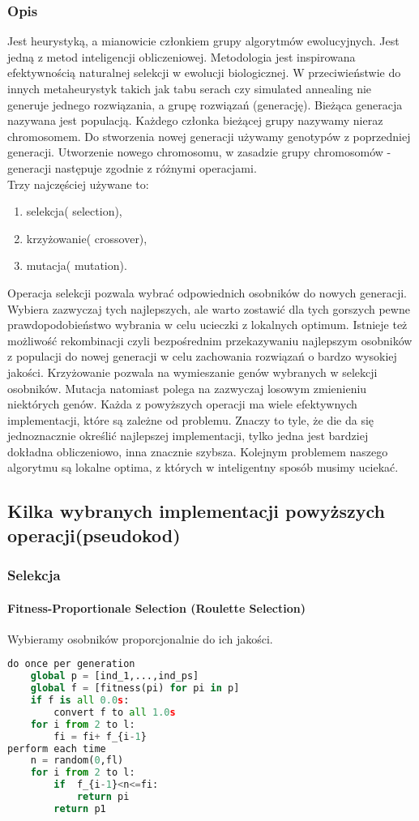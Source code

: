 \documentclass[11pt]{article}
\begin{document}
\subsubsection{Opis}
Jest heurystyką, a mianowicie członkiem grupy algorytmów ewolucyjnych. Jest jedną z metod inteligencji obliczeniowej. Metodologia jest inspirowana efektywnością naturalnej selekcji w ewolucji biologicznej. W przeciwieństwie do innych metaheurystyk takich jak tabu serach czy simulated annealing nie generuje jednego rozwiązania, a grupę rozwiązań (generację). Bieżąca generacja nazywana jest populacją. Każdego członka bieżącej grupy nazywamy nieraz chromosomem. Do stworzenia nowej generacji używamy genotypów z poprzedniej generacji. Utworzenie nowego chromosomu, w zasadzie grupy chromosomów - generacji następuje zgodnie z różnymi operacjami.\\ Trzy najczęściej używane to: \begin{enumerate}
\item selekcja( selection),
\item krzyżowanie( crossover),
\item mutacja( mutation). 
\end{enumerate} 
Operacja selekcji pozwala wybrać odpowiednich osobników do nowych generacji. Wybiera zazwyczaj tych najlepszych, ale warto zostawić dla tych gorszych pewne prawdopodobieństwo wybrania w celu ucieczki z lokalnych optimum. Istnieje też możliwość rekombinacji czyli bezpośrednim przekazywaniu najlepszym osobników z populacji do nowej generacji w celu zachowania rozwiązań o bardzo wysokiej jakości. Krzyżowanie pozwala na wymieszanie genów wybranych w selekcji osobników. Mutacja natomiast polega na zazwyczaj losowym zmienieniu niektórych genów. Każda z powyższych operacji ma wiele efektywnych implementacji, które są zależne od problemu. Znaczy to tyle, że die da się jednoznacznie określić  najlepszej implementacji, tylko jedna jest bardziej dokładna obliczeniowo, inna znacznie szybsza. Kolejnym problemem naszego algorytmu są lokalne optima, z których w inteligentny sposób musimy uciekać.
\subsection{Kilka wybranych implementacji powyższych operacji(pseudokod)}
\subsubsection{Selekcja}
\paragraph{Fitness-Proportionale Selection (Roulette Selection)}
 Wybieramy osobników proporcjonalnie do ich jakości.
\begin{lstlisting}[language=Python]
do once per generation
	global p = [ind_1,...,ind_ps]
	global f = [fitness(pi) for pi in p]
	if f is all 0.0s:
		convert f to all 1.0s
	for i from 2 to l:
		fi = fi+ f_{i-1}
perform each time
	n = random(0,fl)
	for i from 2 to l:
		if  f_{i-1}<n<=fi:
			return pi
    	return p1
\end{lstlisting}
\end{document}
